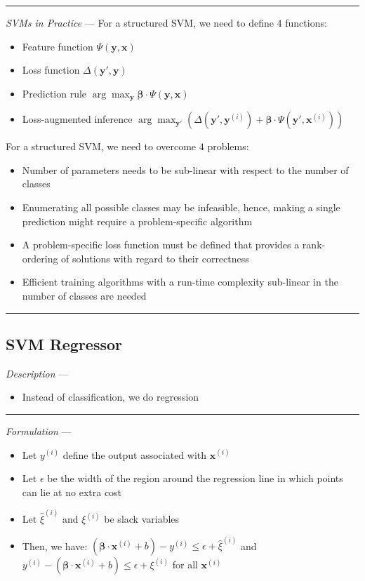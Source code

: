 {\color{lightgray}\hrule height 0.001mm}

\emph{SVMs in Practice} ---
For a structured SVM, we need to define $4$ functions: 
\begin{itemize}
    \item Feature function $\Psi(\boldsymbol{y}, \boldsymbol{x})$
    \item Loss function $\Delta(\boldsymbol{y}', \boldsymbol{y})$
    \item Prediction rule $\arg\max_{\boldsymbol{y}} \boldsymbol{\beta} \cdot \Psi(\boldsymbol{y}, \boldsymbol{x})$
    \item Loss-augmented inference $\arg\max_{\boldsymbol{y}'} \left( \Delta(\boldsymbol{y}', \boldsymbol{y}^{(i)}) + \boldsymbol{\beta} \cdot \Psi(\boldsymbol{y}', \boldsymbol{x}^{(i)}) \right)$
\end{itemize}
For a structured SVM, we need to overcome $4$ problems:
\begin{itemize}
    \item Number of parameters needs to be sub-linear with respect to the number of classes
    \item Enumerating all possible classes may be infeasible, hence, making a single prediction might require a problem-specific algorithm
    \item A problem-specific loss function must be defined that provides a rank-ordering of solutions with regard to their correctness
    \item Efficient training algorithms with a run-time complexity sub-linear in the number of classes are needed
\end{itemize}

{\color{black}\hrule height 0.001mm}

\subsection*{SVM Regressor}
\emph{Description} --- 
\begin{itemize}
    \item Instead of classification, we do regression
\end{itemize}

{\color{lightgray}\hrule height 0.001mm}

\emph{Formulation} --- 
\begin{itemize}
    \item Let $y^{(i)}$ define the output associated with $ \boldsymbol{x}^{(i)}$
    \item Let $\epsilon$ be the width of the region around the regression line in which points can lie at no extra cost
    \item Let $\hat{\xi}^{(i)}$ and $\xi^{(i)}$ be slack variables
    \item Then, we have:
    $(\boldsymbol{\beta} \cdot \boldsymbol{x}^{(i)} + b) - y^{(i)} \leq \epsilon + \hat{\xi}^{(i)}$ and $y^{(i)} - (\boldsymbol{\beta} \cdot \boldsymbol{x}^{(i)} + b) \leq \epsilon + \xi^{(i)}$ for all $\boldsymbol{x}^{(i)}$
\end{itemize}

